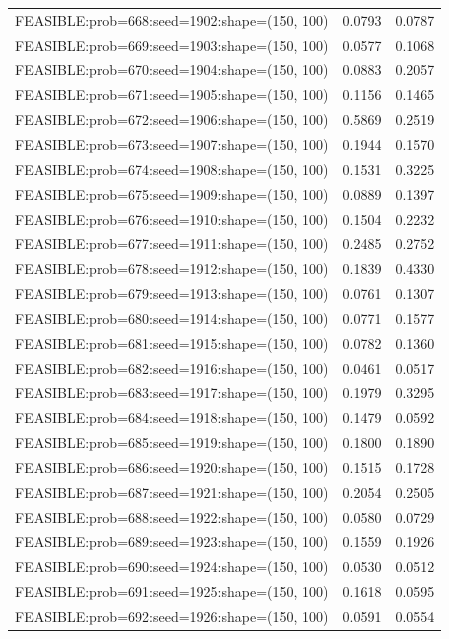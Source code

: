 \begin{longtable}{lcc}
FEASIBLE:prob=668:seed=1902:shape=(150, 100) &   0.0793 & 0.0787 \\
FEASIBLE:prob=669:seed=1903:shape=(150, 100) &   0.0577 & 0.1068 \\
FEASIBLE:prob=670:seed=1904:shape=(150, 100) &   0.0883 & 0.2057 \\
FEASIBLE:prob=671:seed=1905:shape=(150, 100) &   0.1156 & 0.1465 \\
FEASIBLE:prob=672:seed=1906:shape=(150, 100) &   0.5869 & 0.2519 \\
FEASIBLE:prob=673:seed=1907:shape=(150, 100) &   0.1944 & 0.1570 \\
FEASIBLE:prob=674:seed=1908:shape=(150, 100) &   0.1531 & 0.3225 \\
FEASIBLE:prob=675:seed=1909:shape=(150, 100) &   0.0889 & 0.1397 \\
FEASIBLE:prob=676:seed=1910:shape=(150, 100) &   0.1504 & 0.2232 \\
FEASIBLE:prob=677:seed=1911:shape=(150, 100) &   0.2485 & 0.2752 \\
FEASIBLE:prob=678:seed=1912:shape=(150, 100) &   0.1839 & 0.4330 \\
FEASIBLE:prob=679:seed=1913:shape=(150, 100) &   0.0761 & 0.1307 \\
FEASIBLE:prob=680:seed=1914:shape=(150, 100) &   0.0771 & 0.1577 \\
FEASIBLE:prob=681:seed=1915:shape=(150, 100) &   0.0782 & 0.1360 \\
FEASIBLE:prob=682:seed=1916:shape=(150, 100) &   0.0461 & 0.0517 \\
FEASIBLE:prob=683:seed=1917:shape=(150, 100) &   0.1979 & 0.3295 \\
FEASIBLE:prob=684:seed=1918:shape=(150, 100) &   0.1479 & 0.0592 \\
FEASIBLE:prob=685:seed=1919:shape=(150, 100) &   0.1800 & 0.1890 \\
FEASIBLE:prob=686:seed=1920:shape=(150, 100) &   0.1515 & 0.1728 \\
FEASIBLE:prob=687:seed=1921:shape=(150, 100) &   0.2054 & 0.2505 \\
FEASIBLE:prob=688:seed=1922:shape=(150, 100) &   0.0580 & 0.0729 \\
FEASIBLE:prob=689:seed=1923:shape=(150, 100) &   0.1559 & 0.1926 \\
FEASIBLE:prob=690:seed=1924:shape=(150, 100) &   0.0530 & 0.0512 \\
FEASIBLE:prob=691:seed=1925:shape=(150, 100) &   0.1618 & 0.0595 \\
FEASIBLE:prob=692:seed=1926:shape=(150, 100) &   0.0591 & 0.0554 \\

\end{longtable}
